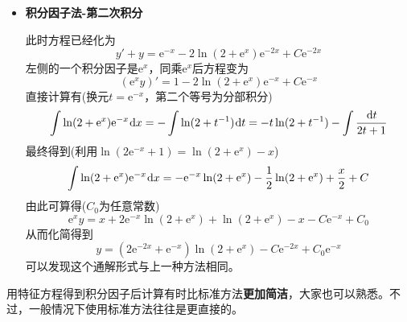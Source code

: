 \documentclass[a4paper,UTF8,fontset=windows,AutoFakeBold]{ctexart}
\newcommand*{\dr}{\hspace{0.07em}\mathrm{d}}
\newcommand*{\er}{\mathrm{e}}
\newcommand*{\note}{\noindent *}
\theoremstyle{ex}
\begin{document}
\begin{framed}
{\begin{itemize}
        \item \textbf{积分因子法-第二次积分}
        
        此时方程已经化为
        $$y'+y=\er^{-x}-2\ln(2+\er^x)\er^{-2x}+C\er^{-2x}$$
        左侧的一个积分因子是$\er^x$，同乘$\er^x$后方程变为
        $$(\er^xy)'=1-2\ln(2+\er^x)\er^{-x}+C\er^{-x}$$
        直接计算有(换元$t=\er^{-x}$，第二个等号为分部积分)
        $$\int\ln(2+\er^x)\er^{-x}\dr x=-\int\ln(2+t^{-1})\dr t=-t\ln(2+t^{-1})-\int\frac{\dr t}{2t+1}$$
        最终得到(利用$\ln(2\er^{-x}+1)=\ln(2+\er^x)-x$)
        $$\int\ln(2+\er^x)\er^{-x}\dr x=-\er^{-x}\ln(2+\er^x)-\frac{1}{2}\ln(2+\er^x)+\frac{x}{2}+C$$
        由此可算得($C_0$为任意常数)
        $$\er^xy=x+2\er^{-x}\ln(2+\er^x)+\ln(2+\er^x)-x-C\er^{-x}+C_0$$
        从而化简得到
        $$y=(2\er^{-2x}+\er^{-x})\ln(2+\er^x)-C\er^{-2x}+C_0\er^{-x}$$
        可以发现这个通解形式与上一种方法相同。
    \end{itemize}
}
\end{framed}

\note 用特征方程得到积分因子后计算有时比标准方法\textbf{更加简洁}，大家也可以熟悉。不过，一般情况下使用标准方法往往是更直接的。
\end{document}
